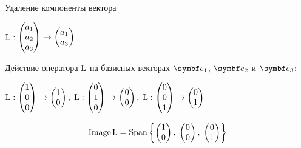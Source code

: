 \begin{frame}{Удаление компоненты вектора}

$\operatorname{L} : \begin{pmatrix}
  a_1 \\
  a_2 \\
  a_3 \\
\end{pmatrix} \to 
\begin{pmatrix}
  a_1 \\
  a_3 \\
\end{pmatrix}$

\pause

Действие оператора $\operatorname{L}$ на базисных векторах $\be_1$, $\be_2$ и $\be_3$:

$\operatorname{L} : \begin{pmatrix}
  1 \\
  0 \\
  0 \\
\end{pmatrix} \to 
\begin{pmatrix}
1  \\
0  \\
\end{pmatrix}, \;
\operatorname{L} : \begin{pmatrix}
  0 \\
  1 \\
  0 \\
\end{pmatrix} \to 
\begin{pmatrix}
0 \\
0 \\
\end{pmatrix}, \;
\operatorname{L} : \begin{pmatrix}
  0 \\
  0 \\
  1 \\
\end{pmatrix} \to 
\begin{pmatrix}
0 \\
1 \\
\end{pmatrix}$

\pause

\[
\operatorname{Image} \operatorname{L} = \operatorname{Span} \left\{\begin{pmatrix}
1 \\
0 \\
\end{pmatrix}, \;
\begin{pmatrix}
0 \\
0 \\
\end{pmatrix}, \;
\begin{pmatrix}
0 \\
1 \\
\end{pmatrix}
\right\}    
\]


\end{frame}
